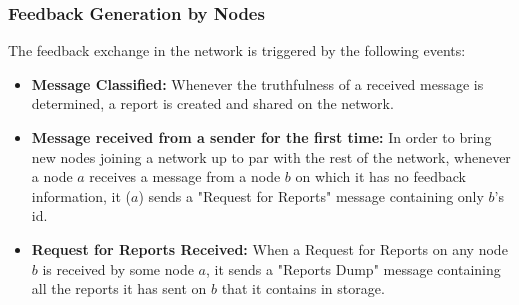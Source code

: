 \documentclass[journal]{IEEEtran}
\begin{document}
\subsubsection{Feedback Generation by Nodes}
The feedback exchange in the network is triggered by the following events:
\begin{itemize}
	\item \textbf{Message Classified:} Whenever the truthfulness of a received message is determined, a report is created and shared on the network.
	\item \textbf{Message received from a sender for the first time:} In order to bring new nodes joining a network up to par with the rest of the network, whenever a node $ a $ receives a message from a node $ b $ on which it has no feedback information, it ($ a $) sends a "Request for Reports" message containing only $ b $'s id.
	\item \textbf{Request for Reports Received:} When a Request for Reports on any node $ b $ is received by some node $ a $, it sends a "Reports Dump" message containing all the reports it has sent on $ b $ that it contains in storage.
\end{itemize}
\end{document}
